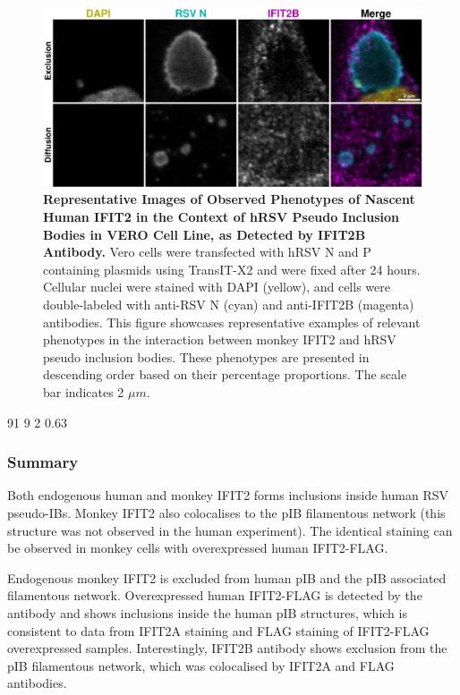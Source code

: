 \begin{figure}
    \centering
    \includegraphics[width=1\linewidth]{08. Chapter 3/Figs/03. pIB/03. IFIT2/03. IFIT2B/06. i2b-vero-hnhp.pdf} 
    \caption[Representative Images of Observed Phenotypes of Nascent Human IFIT2 in the Context of hRSV Pseudo Inclusion Bodies in VERO Cell Line, as Detected by IFIT2B Antibody.]{\textbf{Representative Images of Observed Phenotypes of Nascent Human IFIT2 in the Context of hRSV Pseudo Inclusion Bodies in VERO Cell Line, as Detected by IFIT2B Antibody.} Vero cells were transfected with hRSV N and P containing plasmids using TransIT-X2 and were fixed after 24 hours. Cellular nuclei were stained with DAPI (yellow), and cells were double-labeled with anti-RSV N (cyan) and anti-IFIT2B (magenta) antibodies. This figure showcases representative examples of relevant phenotypes in the interaction between monkey IFIT2 and hRSV pseudo inclusion bodies. These phenotypes are presented in descending order based on their percentage proportions. The scale bar indicates 2 \(\mu m\).}
    \label{fig:Representative Images of Observed Phenotypes of Nascent Human IFIT2 in the Context of hRSV Pseudo Inclusion Bodies in VERO Cell Line, as Detected by IFIT2B Antibody}
\end{figure}

91 9
2 0.63

\subsubsection{Summary} \label{Summary-i2-pib}
Both endogenous human and monkey IFIT2 forms inclusions inside human RSV pseudo-IBs. Monkey IFIT2 also colocalises to the pIB filamentous network (this structure was not observed in the human experiment). The identical staining can be observed in monkey cells with overexpressed human IFIT2-FLAG.

Endogenous monkey IFIT2 is excluded from human pIB and the pIB associated filamentous network. Overexpressed human IFIT2-FLAG is detected by the antibody and shows inclusions inside the human pIB structures, which is consistent to data from IFIT2A staining and FLAG staining of IFIT2-FLAG overexpressed samples. Interestingly, IFIT2B antibody shows exclusion from the pIB filamentous network, which was colocalised by IFIT2A and FLAG antibodies.

